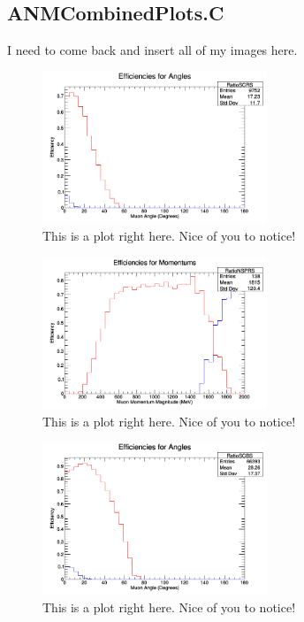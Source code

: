 \documentclass[11pt]{article}
\begin{document}
\subsection{ANMCombinedPlots.C}
I need to come back and insert all of my images here.

\begin{figure}[H]
\centering
\includegraphics[width=0.6\textwidth]{ANMCombinedPlotsImages/1-ANMCombinedPlots.png}
\caption{This is a plot right here. Nice of you to notice!}
\end{figure}

\begin{figure}[H]
\centering
\includegraphics[width=0.6\textwidth]{ANMCombinedPlotsImages/2-ANMCombinedPlots.png}
\caption{This is a plot right here. Nice of you to notice!}
\end{figure}

\begin{figure}[H]
\centering
\includegraphics[width=0.6\textwidth]{ANMCombinedPlotsImages/3-ANMCombinedPlots.png}
\caption{This is a plot right here. Nice of you to notice!}
\end{figure}
\end{document}
